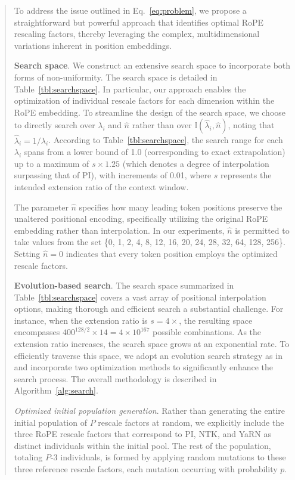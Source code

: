 \begin{abstract}
To address the issue outlined in Eq.~\ref{eq:problem}, we propose a straightforward but powerful approach that identifies optimal RoPE rescaling factors, thereby leveraging the complex, multidimensional variations inherent in position embeddings.

\textbf{Search space}. We construct an extensive search space to incorporate both forms of non-uniformity. The search space is detailed in Table~\ref{tbl:searchspace}. In particular, our approach enables the optimization of individual rescale factors for each dimension within the RoPE embedding. To streamline the design of the search space, we choose to directly search over $\lambda_i$ and $\hat{n}$ rather than over $\mathbb{I}(\hat{\lambda}_{i},\hat{n})$, noting that $\hat{\lambda}_{i}=1/\lambda_i$. According to Table~\ref{tbl:searchspace}, the search range for each $\lambda_i$ spans from a lower bound of 1.0 (corresponding to exact extrapolation) up to a maximum of $s\times1.25$ (which denotes a degree of interpolation surpassing that of PI), with increments of 0.01, where $s$ represents the intended extension ratio of the context window.

The parameter $\hat{n}$ specifies how many leading token positions preserve the unaltered positional encoding, specifically utilizing the original RoPE embedding rather than interpolation. In our experiments, $\hat{n}$ is permitted to take values from the set \{0, 1, 2, 4, 8, 12, 16, 20, 24, 28, 32, 64, 128, 256\}. Setting $\hat{n}=0$ indicates that every token position employs the optimized rescale factors.

\textbf{Evolution-based search}. The search space summarized in Table~\ref{tbl:searchspace} covers a vast array of positional interpolation options, making thorough and efficient search a substantial challenge. For instance, when the extension ratio is $s=4\times$, the resulting space encompasses $400^{128/2}\times14=4\times10^{167}$ possible combinations. As the extension ratio increases, the search space grows at an exponential rate. To efficiently traverse this space, we adopt an evolution search strategy as in~\cite{guo2020single} and incorporate two optimization methods to significantly enhance the search process. The overall methodology is described in Algorithm~\ref{alg:search}.

\textit{Optimized initial population generation}. Rather than generating the entire initial population of $P$ rescale factors at random, we explicitly include the three RoPE rescale factors that correspond to PI, NTK, and YaRN as distinct individuals within the initial pool. The rest of the population, totaling $P$-3 individuals, is formed by applying random mutations to these three reference rescale factors, each mutation occurring with probability $p$.


\end{abstract}
